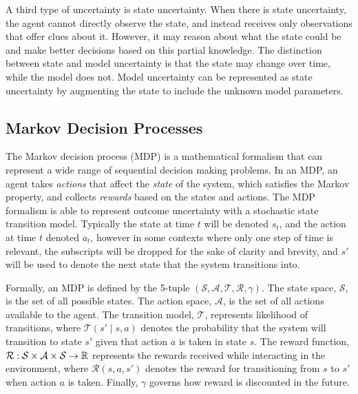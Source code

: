 A third type of uncertainty is state uncertainty.
When there is state uncertainty, the agent cannot directly observe the state, and instead receives only observations that offer clues about it.
However, it may reason about what the state could be and make better decisions based on this partial knowledge.
The distinction between state and model uncertainty is that the state may change over time, while the model does not.
Model uncertainty can be represented as state uncertainty by augmenting the state to include the unknown model parameters.

\subsection{Markov Decision Processes} \label{sec:mdps}

The Markov decision process (MDP) is a mathematical formalism that can represent a wide range of sequential decision making problems. 
In an MDP, an agent takes \emph{actions} that affect the \emph{state} of the system, which satisfies the Markov property, and collects \emph{rewards} based on the states and actions.
The MDP formalism is able to represent outcome uncertainty with a stochastic state transition model.
Typically the state at time $t$ will be denoted $s_t$, and the action at time $t$ denoted $a_t$, however in some contexts where only one step of time is relevant, the subscripts will be dropped for the sake of clarity and brevity, and $s'$ will be used to denote the next state that the system transitions into.

Formally, an MDP is defined by the 5-tuple $(\mathcal{S}, \mathcal{A}, \mathcal{T}, \mathcal{R}, \gamma)$.
The state space, $\mathcal{S}$, is the set of all possible states.
The action space, $\mathcal{A}$, is the set of all actions available to the agent.
The transition model, $\mathcal{T}$, represents likelihood of transitions, where $\mathcal{T}(s' \mid s, a)$ denotes the probability that the system will transition to state $s'$ given that action $a$ is taken in state $s$.
The reward function, $\mathcal{R}: \mathcal{S} \times \mathcal{A} \times \mathcal{S} \to \mathbb{R}$ represents the rewards received while interacting in the environment, where
$\mathcal{R}(s, a, s')$ denotes the reward for transitioning from $s$ to $s'$ when action $a$ is taken.
Finally, $\gamma$ governs how reward is discounted in the future.

